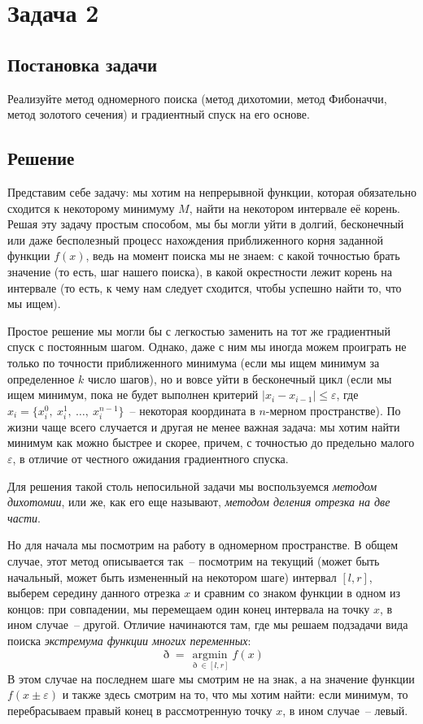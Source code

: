 \documentclass[12pt, a4paper, oneside, final]{article}
\begin{document}
	\section*{Задача 2}
	\subsection*{Постановка задачи}
	Реализуйте метод одномерного поиска (метод дихотомии, метод Фибоначчи, метод золотого сечения) и градиентный спуск на его основе.
	\subsection*{Решение}
	Представим себе задачу: мы хотим на непрерывной функции, которая обязательно сходится к некоторому минимуму $M$, найти на некотором интервале её корень. Решая эту задачу простым способом, мы бы могли уйти в долгий, бесконечный или даже бесполезный процесс нахождения приближенного корня заданной функции $f(x)$, ведь на момент поиска мы не знаем: с какой точностью брать значение (то есть, шаг нашего поиска), в какой окрестности лежит корень на интервале (то есть, к чему нам следует сходится, чтобы успешно найти то, что мы ищем).

	Простое решение мы могли бы с легкостью заменить на тот же градиентный спуск с постоянным шагом. Однако, даже с ним мы иногда можем проиграть не только по точности приближенного минимума (если мы ищем минимум за определенное $k$ число шагов), но и вовсе уйти в бесконечный цикл (если мы ищем минимум, пока не будет выполнен критерий $|x_{i} - x_{i - 1}| \leqslant \varepsilon$, где $x_{i} = \{x^0_{i}, ~ x^1_{i}, ~ \ldots, ~ x^{n - 1}_i\}$~-- некоторая координата в $n$-мерном пространстве). По жизни чаще всего случается и другая не менее важная задача: мы хотим найти минимум как можно быстрее и скорее, причем, с точностью до предельно малого $\varepsilon$, в отличие от честного ожидания градиентного спуска.

	Для решения такой столь непосильной задачи мы воспользуемся \textit{методом дихотомии}, или же, как его еще называют, \textit{методом деления отрезка на две части}.

	Но для начала мы посмотрим на работу в одномерном пространстве. В общем случае, этот метод описывается так~-- посмотрим на текущий (может быть начальный, может быть измененный на некотором шаге) интервал $[l, r]$, выберем середину данного отрезка $x$ и сравним со знаком функции в одном из концов: при совпадении, мы перемещаем один конец интервала на точку $x$, в ином случае~-- другой. Отличие начинаются там, где мы решаем подзадачи вида поиска \textit{экстремума функции многих переменных}:
	\[
		\eth = \operatorname*{argmin}_{\eth \in [l, r]}{f(x)}
	\]
	В этом случае на последнем шаге мы смотрим не на знак, а на значение функции $f(x \pm \varepsilon)$ и также здесь смотрим на то, что мы хотим найти: если минимум, то перебрасываем правый конец в рассмотренную точку $x$, в ином случае~-- левый.
\end{document}
